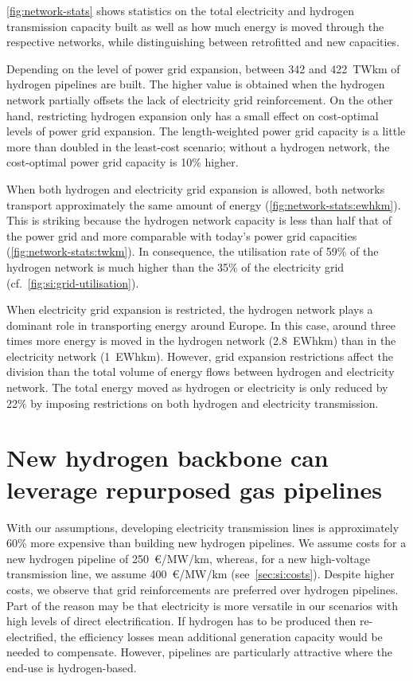 \cref{fig:network-stats} shows statistics on the total electricity and hydrogen
transmission capacity built as well as how much energy is moved through the
respective networks, while distinguishing between retrofitted and new
capacities.

Depending on the level of power grid expansion, between 342 and 422~TWkm of
hydrogen pipelines are built. The higher value is obtained when the hydrogen
network partially offsets the lack of electricity grid reinforcement. On the
other hand, restricting hydrogen expansion only has a small effect on
cost-optimal levels of power grid expansion. The length-weighted power grid
capacity is a little more than doubled in the least-cost scenario; without a
hydrogen network, the cost-optimal power grid capacity is 10\%
higher.

When both hydrogen and electricity grid expansion is allowed, both networks
transport approximately the same amount of energy
(\cref{fig:network-stats:ewhkm}). This is striking because the hydrogen network
capacity is less than half that of the power grid and more comparable with
today's power grid capacities (\cref{fig:network-stats:twkm}). In consequence,
the utilisation rate of 59\% of the hydrogen network is much higher than the 35\% of
the electricity grid (cf.~\cref{fig:si:grid-utilisation}).

When electricity grid expansion is restricted, the hydrogen network plays a
dominant role in transporting energy around Europe. In this case, around three
times more energy is moved in the hydrogen network (2.8~EWhkm) than in the
electricity network (1~EWhkm). However, grid expansion restrictions affect the
division than the total volume of energy flows between hydrogen and electricity
network. The total energy moved as hydrogen or electricity is only reduced by
22\% by imposing restrictions on both hydrogen and electricity transmission.

\section*{New hydrogen backbone can leverage repurposed gas pipelines}
\label{sec:repurposed}

With our assumptions, developing electricity transmission lines is approximately
60\% more expensive than building new hydrogen pipelines. We assume costs for a
new hydrogen pipeline of 250~\euro/MW/km, whereas, for a new
high-voltage transmission line, we assume 400~\euro/MW/km (see~\cref{sec:si:costs}). Despite
higher costs, we observe that grid reinforcements are preferred over hydrogen
pipelines. Part of the reason may be that electricity is more versatile in our
scenarios with high levels of direct electrification. If hydrogen has to be
produced then re-electrified, the efficiency losses mean additional generation
capacity would be needed to compensate. However, pipelines are particularly
attractive where the end-use is hydrogen-based.

